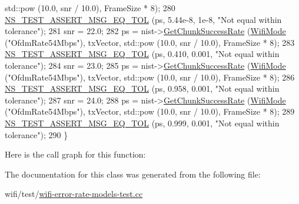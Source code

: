 \begin{DoxyCode}
      std::pow (10.0, snr / 10.0), FrameSize * 8);
280   \hyperlink{group__testing_ga9e7861b56b4e70db3b56044cb7a28e41}{NS\_TEST\_ASSERT\_MSG\_EQ\_TOL} (ps, 5.44e-8, 1e-8, \textcolor{stringliteral}{"Not equal within tolerance"});
281   snr = 22.0;
282   ps = nist->\hyperlink{classns3_1_1NistErrorRateModel_a2316a2c287485d7cc81198c90b246bc0}{GetChunkSuccessRate} (\hyperlink{classns3_1_1WifiMode}{WifiMode} (\textcolor{stringliteral}{"OfdmRate54Mbps"}), txVector, 
      std::pow (10.0, snr / 10.0), FrameSize * 8);
283   \hyperlink{group__testing_ga9e7861b56b4e70db3b56044cb7a28e41}{NS\_TEST\_ASSERT\_MSG\_EQ\_TOL} (ps, 0.410, 0.001, \textcolor{stringliteral}{"Not equal within tolerance"});
284   snr = 23.0;
285   ps = nist->\hyperlink{classns3_1_1NistErrorRateModel_a2316a2c287485d7cc81198c90b246bc0}{GetChunkSuccessRate} (\hyperlink{classns3_1_1WifiMode}{WifiMode} (\textcolor{stringliteral}{"OfdmRate54Mbps"}), txVector, 
      std::pow (10.0, snr / 10.0), FrameSize * 8);
286   \hyperlink{group__testing_ga9e7861b56b4e70db3b56044cb7a28e41}{NS\_TEST\_ASSERT\_MSG\_EQ\_TOL} (ps, 0.958, 0.001, \textcolor{stringliteral}{"Not equal within tolerance"});
287   snr = 24.0;
288   ps = nist->\hyperlink{classns3_1_1NistErrorRateModel_a2316a2c287485d7cc81198c90b246bc0}{GetChunkSuccessRate} (\hyperlink{classns3_1_1WifiMode}{WifiMode} (\textcolor{stringliteral}{"OfdmRate54Mbps"}), txVector, 
      std::pow (10.0, snr / 10.0), FrameSize * 8);
289   \hyperlink{group__testing_ga9e7861b56b4e70db3b56044cb7a28e41}{NS\_TEST\_ASSERT\_MSG\_EQ\_TOL} (ps, 0.999, 0.001, \textcolor{stringliteral}{"Not equal within tolerance"});
290 \}
\end{DoxyCode}


Here is the call graph for this function\+:




The documentation for this class was generated from the following file\+:\begin{DoxyCompactItemize}
\item 
wifi/test/\hyperlink{wifi-error-rate-models-test_8cc}{wifi-\/error-\/rate-\/models-\/test.\+cc}\end{DoxyCompactItemize}
